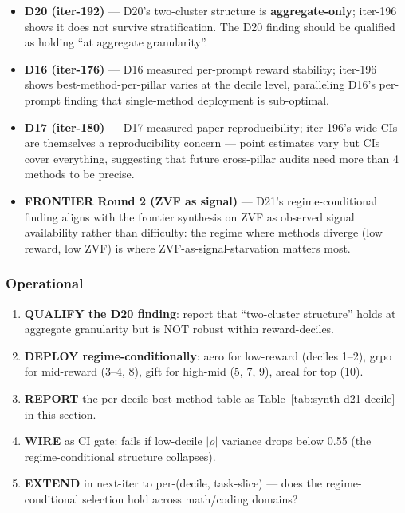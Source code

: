 \begin{itemize}
\item \textbf{D20 (iter-192)} --- D20's two-cluster structure is
  \textbf{aggregate-only}; iter-196 shows it does not survive
  stratification. The D20 finding should be qualified as holding
  ``at aggregate granularity''.
\item \textbf{D16 (iter-176)} --- D16 measured per-prompt reward stability;
  iter-196 shows best-method-per-pillar varies at the decile level,
  paralleling D16's per-prompt finding that single-method deployment is
  sub-optimal.
\item \textbf{D17 (iter-180)} --- D17 measured paper reproducibility; iter-196's
  wide CIs are themselves a reproducibility concern --- point estimates
  vary but CIs cover everything, suggesting that future cross-pillar
  audits need more than 4 methods to be precise.
\item \textbf{FRONTIER Round 2 (ZVF as signal)} --- D21's regime-conditional
  finding aligns with the frontier synthesis on ZVF as observed signal
  availability rather than difficulty: the regime where methods diverge
  (low reward, low ZVF) is where ZVF-as-signal-starvation matters most.
\end{itemize}

\subsubsection{Operational}\label{sec:synth-d21-operational}
\begin{enumerate}
\item \textbf{QUALIFY the D20 finding}: report that ``two-cluster
  structure'' holds at aggregate granularity but is NOT robust within
  reward-deciles.
\item \textbf{DEPLOY regime-conditionally}: aero for low-reward
  (deciles 1--2), grpo for mid-reward (3--4, 8), gift for high-mid
  (5, 7, 9), areal for top (10).
\item \textbf{REPORT} the per-decile best-method table as
  Table~\ref{tab:synth-d21-decile} in this section.
\item \textbf{WIRE} as CI gate: fails if low-decile $|\rho|$ variance
  drops below 0.55 (the regime-conditional structure collapses).
\item \textbf{EXTEND} in next-iter to per-(decile, task-slice) --- does
  the regime-conditional selection hold across math/coding domains?
\end{enumerate}